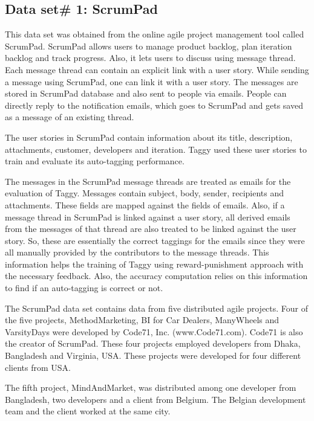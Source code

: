 \subsection{Data set\# 1: ScrumPad}	
This data set was obtained from the online agile project management tool called ScrumPad.	ScrumPad allows users to manage product backlog, plan iteration backlog and track progress. Also, it lets users to discuss using message thread. Each message thread can contain an explicit link with a user story. While sending a message using ScrumPad, one can link it with a user story. The messages are stored in ScrumPad database and also sent to people via emails. People can directly reply to the notification emails, which goes to ScrumPad and gets saved as a message of an existing thread.

The user stories in ScrumPad contain information about its title, description, attachments, customer, developers and iteration. Taggy used these user stories to train and evaluate its auto-tagging performance.

The messages in the ScrumPad message threads are treated as emails for the evaluation of Taggy. Messages contain subject, body, sender, recipients and attachments. These fields are mapped against the fields of emails. Also, if a message thread in ScrumPad is linked against a user story, all derived emails from the messages of that thread are also treated to be linked against the user story. So, these are essentially the correct taggings for the emails since they were all manually provided by the contributors to the message threads. This information helps the training of Taggy using reward-punishment approach with the necessary feedback. Also, the accuracy computation relies on this information to find if an auto-tagging is correct or not.

The ScrumPad data set contains data from five distributed agile projects. Four of the five projects, MethodMarketing, BI for Car Dealers, ManyWheels and VarsityDays were developed by Code71, Inc. (www.Code71.com). Code71 is also the creator of ScrumPad. These four projects employed developers from Dhaka, Bangladesh and Virginia, USA. These projects were developed for four different clients from USA.

The fifth project, MindAndMarket, was distributed among one developer from Bangladesh, two developers and a client from Belgium. The Belgian development team and the client worked at the same city.

